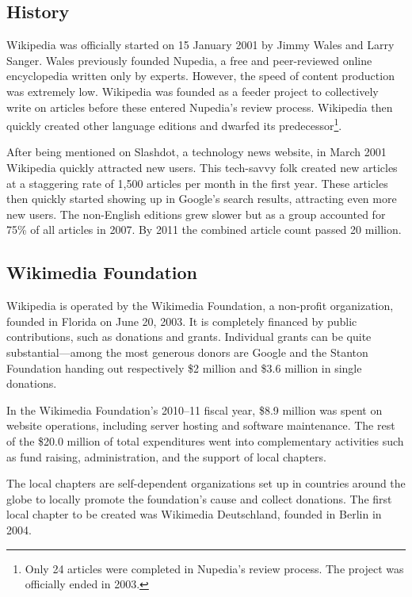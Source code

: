 \subsection{History}

Wikipedia was officially started on 15 January 2001 by Jimmy Wales and Larry Sanger.
Wales previously founded Nupedia, a free and peer-reviewed online encyclopedia written only by experts.
However, the speed of content production was extremely low.
Wikipedia was founded as a feeder project to collectively write on articles before these entered Nupedia's review process.
Wikipedia then quickly created other language editions and dwarfed its predecessor\footnote{Only 24 articles were completed in Nupedia's review process. The project was officially ended in 2003.}.\cite{wphistory}

After being mentioned on Slashdot, a technology news website, in March 2001 Wikipedia quickly attracted new users.
This tech-savvy folk created new articles at a staggering rate of 1,500 articles per month in the first year.
These articles then quickly started showing up in Google's search results, attracting even more new users.
The non-English editions grew slower but as a group accounted for 75\% of all articles in 2007.
By 2011 the combined article count passed 20 million.\cite{wphistory}

\subsection{Wikimedia Foundation}\label{sub:wmf}

Wikipedia is operated by the Wikimedia Foundation, a non-profit organization, founded in Florida on June 20, 2003.
It is completely financed by public contributions, such as donations and grants.
Individual grants can be quite substantial---among the most generous donors are Google and the Stanton Foundation handing out respectively \$2 million and \$3.6 million in single donations.\cite{wmf}

In the Wikimedia Foundation's 2010--11 fiscal year, \$8.9 million was spent on website operations, including server hosting and software maintenance.
The rest of the \$20.0 million of total expenditures went into complementary activities such as fund raising, administration, and the support of local chapters.\cite{wmf201011}

The local chapters are self-dependent organizations set up in countries around the globe to locally promote the foundation's cause and collect donations.
The first local chapter to be created was Wikimedia Deutschland, founded in Berlin in 2004.\cite{wmf}

